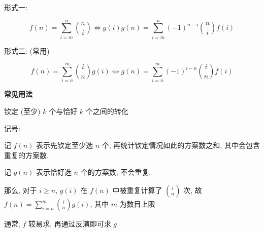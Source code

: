 形式一:

$$
    f(n) = \sum_{i=m}^n {n \choose i} \iff g(i) g(n) = \sum_{i=m}^n (-1)^{n-i}{n \choose i} f(i)
$$

形式二: (常用)

$$
    {f(n) = \sum_{i=n}^m {i \choose n} g(i)} \iff {g(n) = \sum_{i=n}^m (-1)^{i-n} {i \choose n} f(i)}
$$

\textbf{常见用法}

钦定 (至少) $k$ 个与恰好 $k$ 个之间的转化

记号:

记 $f(n)$ 表示先钦定至少选 $n$ 个, 再统计钦定情况如此的方案数之和, 其中会包含重复的方案数.

记 $g(n)$ 表示恰好选 $n$ 个的方案数, 不会重复.

那么, 对于 $i \geq n$, $g(i)$ 在 $f(n)$ 中被重复计算了 ${i \choose n}$ 次, 故 $f(n) = \sum_{i=n}^m {i \choose n} g(i)$, 其中 $m$ 为数目上限

通常, $f$ 较易求, 再通过反演即可求 $g$